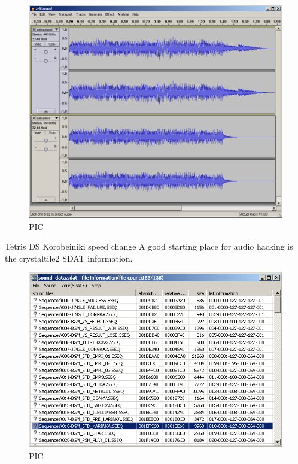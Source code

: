 \documentclass[
]{book}
\begin{document}
\begin{figure}
\centering
\includegraphics{images/156_home_fast6191_romhackingguide_unrenamed_fil___original_borders_romhackguideSDATSSEQedit_4.png}
\caption{PIC}
\end{figure}

Tetris DS Korobeiniki speed change A good starting place for audio hacking is the crystaltile2 SDAT information.

\begin{figure}
\centering
\includegraphics{images/157_home_fast6191_romhackingguide_unrenamed_fil____original_borders_romhackguideSDATlooping_1.png}
\caption{PIC}
\end{figure}
\end{document}

